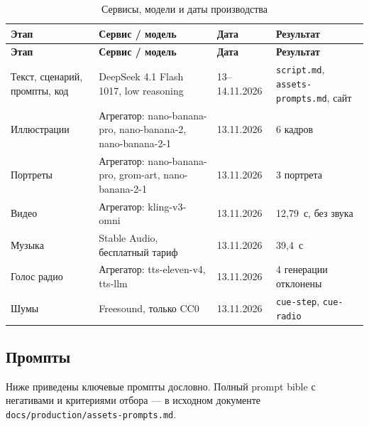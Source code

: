 \documentclass[12pt, a4paper]{article}
\begin{document}
\begin{small}
\setlength{\tabcolsep}{3pt}
\begin{longtable}{@{}L{4.0cm}L{5.0cm}L{2.0cm}L{4.0cm}@{}}
\caption{Сервисы, модели и даты производства}\label{tab:services}\\
\toprule
\textbf{Этап} & \textbf{Сервис / модель} & \textbf{Дата} & \textbf{Результат} \\
\midrule
\endfirsthead
\toprule
\textbf{Этап} & \textbf{Сервис / модель} & \textbf{Дата} & \textbf{Результат} \\
\midrule
\endhead
\bottomrule
\endlastfoot
Текст, сценарий, промпты, код & DeepSeek 4.1 Flash 1017, low reasoning & 13--14.11.2026 & \texttt{script.md}, \texttt{assets-prompts.md}, сайт \\
\addlinespace
Иллюстрации & Агрегатор: nano-banana-pro, nano-banana-2, nano-banana-2-1 & 13.11.2026 & 6 кадров \\
\addlinespace
Портреты & Агрегатор: nano-banana-pro, grom-art, nano-banana-2-1 & 13.11.2026 & 3 портрета \\
\addlinespace
Видео & Агрегатор: kling-v3-omni & 13.11.2026 & 12{,}79~с, без звука \\
\addlinespace
Музыка & Stable Audio, бесплатный тариф & 13.11.2026 & 39{,}4~с \\
\addlinespace
Голос радио & Агрегатор: tts-eleven-v4, tts-llm & 13.11.2026 & 4 генерации отклонены \\
\addlinespace
Шумы & Freesound, только CC0 & 13.11.2026 & \texttt{cue-step}, \texttt{cue-radio} \\
\end{longtable}
\end{small}

\subsection{Промпты}
Ниже приведены ключевые промпты дословно. Полный prompt bible с негативами и критериями отбора --- в исходном документе \texttt{docs/production/assets-prompts.md}.
\end{document}
